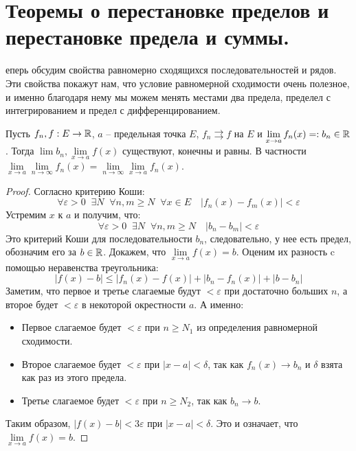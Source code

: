 \section{Теоремы о перестановке пределов и перестановке предела и суммы.}
еперь обсудим свойства равномерно сходящихся последовательностей и рядов.
 Эти свойства покажут нам, что условие равномерной сходимости очень полезное, и именно благодаря нему мы можем менять местами два предела, пределел с интегрированием и предел с дифференцированием.

\vspace*{5mm}

 \begin{theorem}
     Пусть $f_n, f : E \to \mathbb{R}$, $a$ -- предельная точка $E$, $f_n \rightrightarrows f$ на $E$ и $\lim\limits_{x \to a} f_n(x) =: b_n \in \mathbb{R}$. 
     Тогда $\lim b_n, \lim\limits_{x \to a} f(x)$ существуют, конечны и равны.
     В частности $\lim\limits_{x \to a} \lim\limits_{n \to \infty} f_n(x) =  \lim\limits_{n \to \infty} \lim\limits_{x \to a} f_n(x)$.
 \end{theorem}
 \begin{proof}
     Согласно критерию Коши: \[ \forall \varepsilon > 0 \;\; \exists N \;\; \forall n, m \geqslant N \;\; \forall x \in E \quad |f_n(x) - f_m(x)| < \varepsilon \]
     \quad Устремим $x$ к $a$ и получим, что: \[ \forall \varepsilon > 0 \;\; \exists N \;\; \forall n, m \geqslant N \quad |b_n - b_m| < \varepsilon  \]
     \quad Это критерий Коши для последовательности $b_n$, следовательно, у нее есть предел, обозначим его за $b \in \mathbb{R}$.
     Докажем, что $\lim\limits_{x \to a} f(x) = b$. Оценим их разность c помощью неравенства треугольника:
     \[ |f(x) - b| \leqslant |f_n(x) - f(x)| + |b_n - f_n(x)| + |b - b_n| \]
     \quad Заметим, что первое и третье слагаемые будут $< \varepsilon$ при достаточно больших $n$, а второе будет $< \varepsilon$ в некоторой окрестности $a$.
     А именно: \begin{itemize}
         \item Первое слагаемое будет $< \varepsilon$ при $n \geqslant N_1$ из определения равномерной сходимости. 
         \item Второе слагаемое будет $< \varepsilon$ при $|x - a| < \delta$, так как $f_n(x) \to b_n$ и $\delta$ взята как раз из этого предела.
         \item Третье слагаемое будет $< \varepsilon$ при $n \geqslant N_2$, так как $b_n \to b$.
     \end{itemize} 
     \quad Таким образом, $|f(x) - b| < 3\varepsilon$ при $|x - a| < \delta$. Это и означает, что $\lim\limits_{x \to a} f(x) = b$.
 \end{proof}

